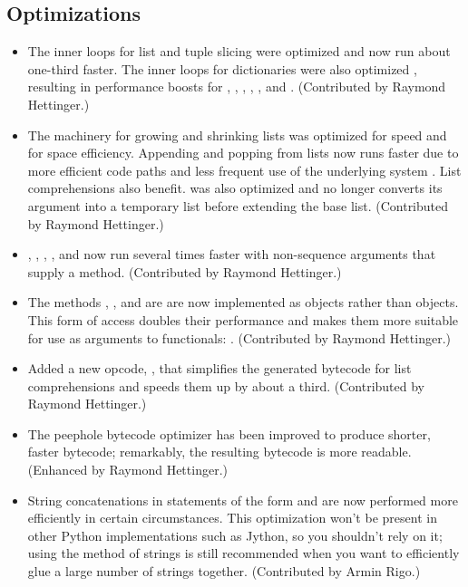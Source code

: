 \documentclass{howto}
\begin{document}
\subsection{Optimizations}

\begin{itemize}

\item The inner loops for list and tuple slicing
 were optimized and now run about one-third faster.  The inner loops
 for dictionaries were also optimized , resulting in performance boosts for
 , , ,
 , , and .
 (Contributed by Raymond Hettinger.)

\item The machinery for growing and shrinking lists was optimized for
 speed and for space efficiency.  Appending and popping from lists now
 runs faster due to more efficient code paths and less frequent use of
 the underlying system .  List comprehensions
 also benefit.    was also optimized and no
 longer converts its argument into a temporary list before extending
 the base list.  (Contributed by Raymond Hettinger.)

\item {}, , ,
  , and  now run several times
  faster with non-sequence arguments that supply a 
  method.  (Contributed by Raymond Hettinger.)

\item The methods ,
  , and  are
  are now implemented as  objects rather
  than  objects.  This form of 
  access doubles their performance and makes them more suitable for
  use as arguments to functionals:
  .
  (Contributed by Raymond Hettinger.)

\item Added a new opcode, , that simplifies
  the generated bytecode for list comprehensions and speeds them up
  by about a third.  (Contributed by Raymond Hettinger.)

\item The peephole bytecode optimizer has been improved to 
produce shorter, faster bytecode; remarkably, the resulting bytecode is 
more readable.  (Enhanced by Raymond Hettinger.)

\item String concatenations in statements of the form  and  are now performed more efficiently in
certain circumstances.  This optimization won't be present in other
Python implementations such as Jython, so you shouldn't rely on it;
using the  method of strings is still recommended when
you want to efficiently glue a large number of strings together.
(Contributed by Armin Rigo.)       

\end{itemize}
\end{document}

